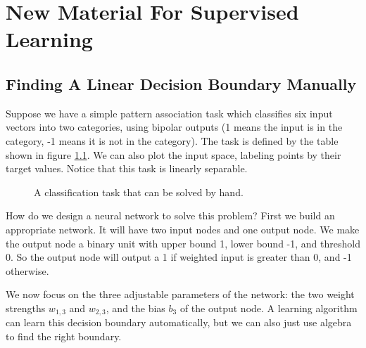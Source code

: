 \chapter{New Material For Supervised Learning}

\section{Finding A Linear Decision Boundary Manually}

Suppose we have a simple pattern association task which classifies six input vectors into two categories, using bipolar outputs (1 means the input is in the category, -1 means it is not in the category). The task is defined by the table shown in  figure \ref{simpleTask}.  We can also plot the input space, labeling points by their target values. Notice that this task is linearly separable. 

\begin{figure}[h]
\centering
{}
\caption{A classification task that can be solved by hand.}
\label{simpleTask}
\end{figure}

How do we design a neural network to solve this problem? First we build an appropriate network. It will have two input nodes and one output node. We make the output node a binary unit with upper bound 1, lower bound -1, and threshold 0. So the output node will output a 1 if weighted input is greater than 0, and -1 otherwise.

We now focus on the three adjustable parameters of the network: the two weight strengths $w_{1,3}$ and $w_{2,3}$, and the bias $b_3$ of the output node. A learning algorithm can learn this decision boundary automatically, but we can also just use algebra to find the right boundary.


